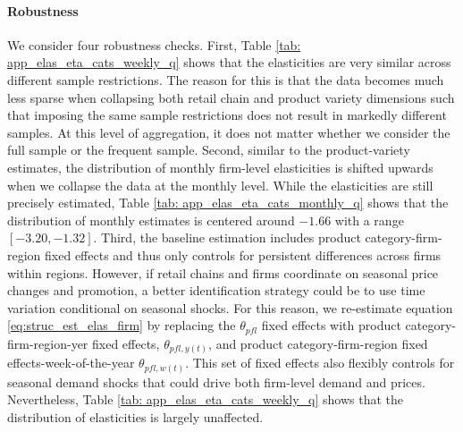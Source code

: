 \paragraph{Robustness} We consider four robustness checks. First, Table \ref{tab: app_elas_eta_cats_weekly_q} shows that the elasticities are very similar across different sample restrictions. The reason for this is that the data becomes much less sparse when collapsing both retail chain and product variety dimensions such that imposing the same sample restrictions does not result in markedly different samples. At this level of aggregation, it does not matter whether we consider the full sample or the frequent sample. Second, similar to the product-variety estimates, the distribution of monthly firm-level elasticities is shifted upwards when we collapse the data at the monthly level. While the elasticities are still precisely estimated, Table \ref{tab: app_elas_eta_cats_monthly_q} shows that the distribution of monthly estimates is centered around $-1.66$ with a range $[-3.20,-1.32]$. Third, the baseline estimation includes product category-firm-region fixed effects and thus only controls for persistent differences across firms within regions. However, if retail chains and firms coordinate on seasonal price changes and promotion, a better identification strategy could be to use time variation conditional on seasonal shocks. For this reason, we re-estimate equation \ref{eq:struc_est_elas_firm} by replacing the $\theta_{pfl}$ fixed effects with product category-firm-region-yer fixed effects, $\theta_{pfl,y(t)}$, and product category-firm-region fixed effects-week-of-the-year $\theta_{pfl,w(t)}$. This set of fixed effects also flexibly controls for seasonal demand shocks that could drive both firm-level demand and prices. Nevertheless, Table \ref{tab: app_elas_eta_cats_weekly_q} shows that the distribution of elasticities is largely unaffected.

